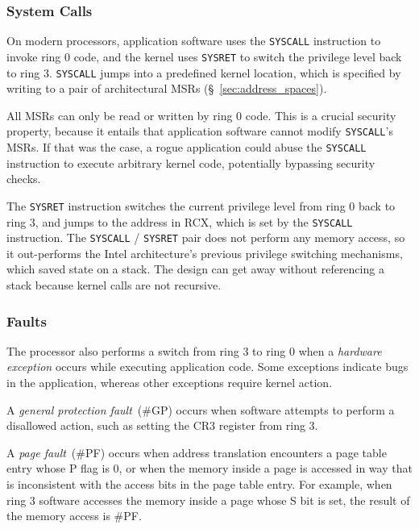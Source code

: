 \subsubsection{System Calls}
\label{sec:syscalls}


On modern processors, application software uses the \texttt{SYSCALL}
instruction to invoke ring 0 code, and the kernel uses \texttt{SYSRET} to
switch the privilege level back to ring 3. \texttt{SYSCALL} jumps into a
predefined kernel location, which is specified by writing to a pair of
architectural MSRs (\S~\ref{sec:address_spaces}).

All MSRs can only be read or written by ring 0 code. This is a crucial security
property, because it entails that application software cannot modify
\texttt{SYSCALL}'s MSRs. If that was the case, a rogue application could abuse
the \texttt{SYSCALL} instruction to execute arbitrary kernel code, potentially
bypassing security checks.

The \texttt{SYSRET} instruction switches the current privilege level from ring
0 back to ring 3, and jumps to the address in RCX, which is set by the
\texttt{SYSCALL} instruction. The \texttt{SYSCALL} / \texttt{SYSRET} pair does
not perform any memory access, so it out-performs the Intel architecture's
previous privilege switching mechanisms, which saved state on a stack. The
design can get away without referencing a stack because kernel calls are not
recursive.


\subsubsection{Faults}
\label{sec:faults}


The processor also performs a switch from ring 3 to ring 0 when a
\textit{hardware exception} occurs while executing application code. Some
exceptions indicate bugs in the application, whereas other exceptions require
kernel action.

A \textit{general protection fault}~(\#GP) occurs when software attempts to
perform a disallowed action, such as setting the CR3 register from ring 3.

A \textit{page fault}~(\#PF) occurs when address translation encounters a page
table entry whose P flag is 0, or when the memory inside a page is accessed in
way that is inconsistent with the access bits in the page table entry. For
example, when ring 3 software accesses the memory inside a page whose S bit is
set, the result of the memory access is \#PF.

